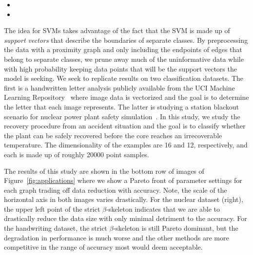 \begin{itemize}
    \item {}
    \item {}
\end{itemize}

The idea for SVMs takes advantage of the fact that the SVM is made up of \textit{support vectors} that describe the boundaries of separate classes.
%
By preprocessing the data with a proximity graph and only including the endpoints of edges that belong to separate classes, we prune away much of the uninformative data while with high probability keeping data points that will be the support vectors the model is seeking.
%
We seek to replicate results on two classification datasets.
%
The first is a handwritten letter analysis publicly available from the UCI Machine Learning Repository~\cite{DuaGraff2017} where image data is vectorized and the goal is to determine the letter that each image represents.
%
The latter is studying a station blackout scenario for nuclear power plant safety simulation~\cite{MaljovecLiuWang2015}.
%
In this study, we study the recovery procedure from an accident situation and the goal is to classify whether the plant can be safely recovered before the core reaches an irrecoverable temperature.
%
The dimensionality of the examples are 16 and 12, respectively, and each is made up of roughly 20000 point samples.

The results of this study are shown in the bottom row of images of Figure~\ref{fig:applications} where we show a Pareto front of parameter settings for each graph trading off data reduction with accuracy.
%
Note, the scale of the horizontal axis in both images varies drastically.
%
For the nuclear dataset (right), the upper left point of the strict $\beta$-skeleton indicates that we are able to drastically reduce the data size with only minimal detriment to the accuracy.
%
For the handwriting dataset, the strict $\beta$-skeleton is still Pareto dominant, but the degradation in performance is much worse and the other methods are more competitive in the range of accuracy most would deem acceptable.

